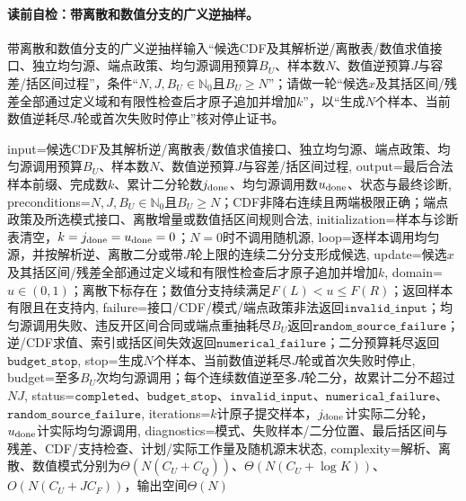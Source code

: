 \paragraph{读前自检：带离散和数值分支的广义逆抽样。}带离散和数值分支的广义逆抽样输入“候选CDF及其解析逆/离散表/数值求值接口、独立均匀源、端点政策、均匀源调用预算$B_U$、样本数$N$、数值逆预算$J$与容差/括区间过程”，条件“$N,J,B_U\in\mathbb N_0$且$B_U\ge N$”；请做一轮“候选$x$及其括区间/残差全部通过定义域和有限性检查后才原子追加并增加$k$”，以“生成$N$个样本、当前数值逆耗尽$J$轮或首次失败时停止”核对停止证书。\par

\begin{AlgorithmContract}{
  input={候选CDF及其解析逆/离散表/数值求值接口、独立均匀源、端点政策、均匀源调用预算$B_U$、样本数$N$、数值逆预算$J$与容差/括区间过程},
  output={最后合法样本前缀、完成数$k$、累计二分轮数$j_{\rm done}$、均匀源调用数$u_{\rm done}$、状态与最终诊断},
  preconditions={$N,J,B_U\in\mathbb N_0$且$B_U\ge N$；CDF非降右连续且两端极限正确；端点政策及所选模式接口、离散增量或数值括区间规则合法},
  initialization={样本与诊断表清空，$k=j_{\rm done}=u_{\rm done}=0$；$N=0$时不调用随机源},
  loop={逐样本调用均匀源，并按解析逆、离散二分或带$J$轮上限的连续二分分支形成候选},
  update={候选$x$及其括区间/残差全部通过定义域和有限性检查后才原子追加并增加$k$},
  domain={$u\in(0,1)$；离散下标存在；数值分支持续满足$F(L)<u\le F(R)$；返回样本有限且在支持内},
  failure={接口/CDF/模式/端点政策非法返回$\mathtt{invalid\_input}$；均匀源调用失败、违反开区间合同或端点重抽耗尽$B_U$返回$\mathtt{random\_source\_failure}$；逆/CDF求值、索引或括区间失效返回$\mathtt{numerical\_failure}$；二分预算耗尽返回$\mathtt{budget\_stop}$},
  stop={生成$N$个样本、当前数值逆耗尽$J$轮或首次失败时停止},
  budget={至多$B_U$次均匀源调用；每个连续数值逆至多$J$轮二分，故累计二分不超过$NJ$},
  status={$\mathtt{completed}$、$\mathtt{budget\_stop}$、$\mathtt{invalid\_input}$、$\mathtt{numerical\_failure}$、$\mathtt{random\_source\_failure}$},
  iterations={$k$计原子提交样本，$j_{\rm done}$计实际二分轮，$u_{\rm done}$计实际均匀源调用},
  diagnostics={模式、失败样本/二分位置、最后括区间与残差、CDF/支持检查、计划/实际工作量及随机源末状态},
  complexity={解析、离散、数值模式分别为$\Theta(N(C_U+C_Q))$、$\Theta(N(C_U+\log K))$、$O(N(C_U+JC_F))$，输出空间$\Theta(N)$}
}
\begin{algorithm}[!t]
\caption{带离散和数值分支的广义逆抽样}\label{alg:V5-C02-generalized-inverse}

\end{algorithm}
\end{AlgorithmContract}
